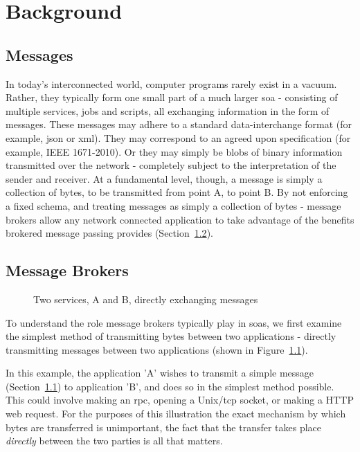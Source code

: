 \chapter{Background}
\label{chap:Background}

\section{Messages}
\label{sec:messages}

In today's interconnected world, computer programs rarely exist in a vacuum.
Rather, they typically form one small part of a much larger \gls{soa} -
consisting of multiple services, jobs and scripts, all exchanging information in
the form of messages. These messages may adhere to a standard data-interchange
format (for example, \gls{json} or \gls{xml}). They may correspond to an agreed
upon specification (for example, IEEE 1671-2010\cite{atml}). Or they may simply
be blobs of binary information transmitted over the network - completely subject
to the interpretation of the sender and receiver. At a fundamental level,
though, a message is simply a collection of bytes, to be transmitted from point
A, to point B. By not enforcing a fixed schema, and treating messages as simply
a collection of bytes - message brokers allow any network connected application
to take advantage of the benefits brokered message passing provides
(Section~\ref{sec:brokers}).

\section{Message Brokers}
\label{sec:brokers}

\begin{figure}[ht]
  \centering
  
  \caption{Two services, A and B, directly exchanging messages}
  \label{fig:tikz:directMessaging}
\end{figure}

To understand the role message brokers typically play in \glspl{soa}, we first
examine the simplest method of transmitting bytes between two applications -
directly transmitting messages between two applications (shown in
Figure~\ref{fig:tikz:directMessaging}).

In this example, the application 'A' wishes to transmit a simple message
(Section~\ref{sec:messages}) to application 'B', and does so in the simplest
method possible. This could involve making an \gls{rpc}, opening a
Unix/\gls{tcp} socket, or making a HTTP web request. For the purposes of this
illustration the exact mechanism by which bytes are transferred is unimportant,
the fact that the transfer takes place \emph{directly} between the two parties
is all that matters.

